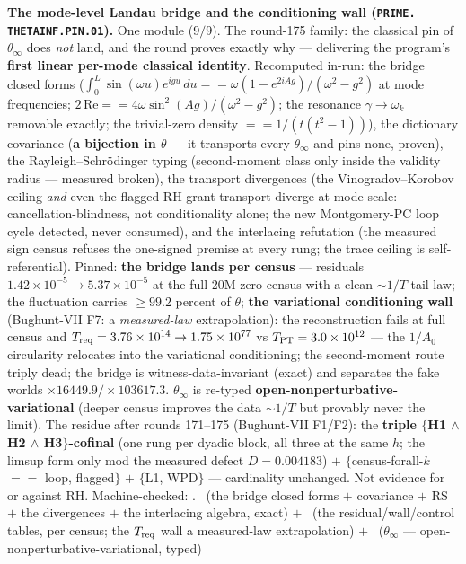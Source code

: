 \documentclass[11pt,a4paper]{article}
\theoremstyle{definition}
\begin{document}
\par\smallskip\noindent\textbf{The mode-level Landau bridge and
the conditioning wall (\texttt{PRIME.\allowbreak
THETAINF.\allowbreak PIN.01}).}
One module ($9/9$).  The round-175 family: the classical pin of
$\theta_\infty$ does \emph{not} land, and the round proves
exactly why --- delivering the program's \textbf{first linear
per-mode classical identity}.  Recomputed in-run: the bridge
closed forms ($\int_0^L \sin(\omega u)e^{igu}\,du ==
\omega(1 - e^{2iAg})/(\omega^2 - g^2)$ at mode frequencies;
$2\,\mathrm{Re} == 4\omega\sin^2(Ag)/(\omega^2 - g^2)$; the
resonance $\gamma \to \omega_k$ removable exactly; the
trivial-zero density $== 1/(t(t^2 - 1))$), the dictionary
covariance (\textbf{a bijection in $\theta$} --- it transports
every $\theta_\infty$ and pins none, proven), the
Rayleigh--Schr\"odinger typing (second-moment class only inside
the validity radius --- measured broken), the transport
divergences (the Vinogradov--Korobov ceiling \emph{and} even the
flagged RH-grant transport diverge at mode scale:
cancellation-blindness, not conditionality alone; the new
Montgomery-PC loop cycle detected, never consumed), and the
interlacing refutation (the measured sign census refuses the
one-signed premise at every rung; the trace ceiling is
self-referential).  Pinned: \textbf{the bridge lands per census}
--- residuals $1.42\times10^{-5} \to 5.37\times10^{-5}$ at the
full 20M-zero census with a clean ${\sim}1/T$ tail law; the
fluctuation carries $\ge 99.2$ percent of $\theta$;
\textbf{the variational conditioning wall} (Bughunt-VII F7: a
\emph{measured-law} extrapolation): the reconstruction fails at
full census and $T_{\rm req} = 3.76\times10^{14} \to
1.75\times10^{77}$ vs $T_{\rm PT} = 3.0\times10^{12}$ --- the
$1/A_0$ circularity relocates into the variational conditioning;
the second-moment route triply dead; the bridge is
witness-data-invariant (exact) and separates the fake worlds
$\times 16449.9/\times 103617.3$.  $\theta_\infty$ is re-typed
\textbf{open-nonperturbative-variational} (deeper census
improves the data ${\sim}1/T$ but provably never the limit).
The residue after rounds 171--175 (Bughunt-VII F1/F2): the
\textbf{triple $\{$H1 $\wedge$ H2 $\wedge$ H3$\}$-cofinal} (one
rung per dyadic block, all three at the same $h$; the limsup
form only mod the measured defect $D = 0.004183$) $+$
$\{$census-forall-$k$ $==$ loop, flagged$\}$ $+$ $\{$L1,
WPD$\}$ --- cardinality unchanged.  Not evidence for or against
RH.
Machine-checked: .
\mE\ (the bridge closed forms $+$ covariance $+$ RS $+$ the
divergences $+$ the interlacing algebra, exact) $+$ \mC\ (the
residual/wall/control tables, per census; the $T_{\rm req}$ wall
a measured-law extrapolation) $+$ \mO\ ($\theta_\infty$ ---
open-nonperturbative-variational, typed)
\par\smallskip
\end{document}
